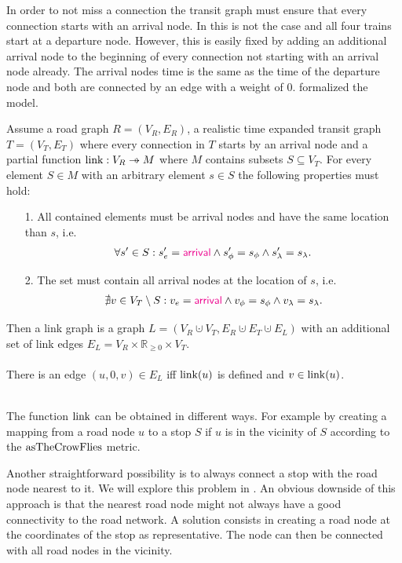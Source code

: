 	In order to not miss a connection the transit graph must ensure that every connection starts with an arrival node.
	In  this is not the case and all four trains start at a departure node. However,
	this is easily fixed by adding an additional arrival node to the beginning of every connection not starting with an arrival node already.
	The arrival nodes time is the same as the time of the departure node and both are connected by an edge with a weight of $0$.
	 formalized the model.
	\begin{mydef}\label{linkGraph}
		Assume a road graph $R = (V_R, E_R)$, a realistic time expanded transit graph $T = (V_T, E_T)$ where
		every connection in $T$ starts by an arrival node and a partial function $\link : V_R \pto M$ where $M$
		contains subsets $S \subseteq V_T$. For every element $S \in M$ with an arbitrary element $s \in S$ the following
		properties must hold:
		\begin{itemize}
			\item[1.]
				All contained elements must be arrival nodes and have the same location than $s$, i.e.
				\begin{align*}
					\forall s' \in S : s'_e = \textcolor{magenta}{\textsf{arrival}} \land s'_\phi = s_\phi \land s'_\lambda = s_\lambda.
				\end{align*}
			\item[2.]
				The set must contain all arrival nodes at the location of $s$, i.e.
				\begin{align*}
					\nexists v \in V_T \setminus S : v_e = \textcolor{magenta}{\textsf{arrival}} \land v_\phi = s_\phi \land v_\lambda = s_\lambda.
				\end{align*}
		\end{itemize}
		Then a \textnormal{link graph} is a graph $L = (V_R \cupdot V_T, E_R \cupdot E_T \cupdot E_L)$ with
		an additional set of link edges $E_L = V_R \times \mathbb{R}_{\ge 0} \times V_T$.\\\\
		There is an edge $(u, 0, v) \in E_L$ iff $\operatorname{link}(u)$ is defined and $v \in \operatorname{link}(u)$.
	\end{mydef}\quad\\
	The function $\operatorname{link}$ can be obtained in different ways. For example by creating a mapping from a road node $u$ to
	a stop $S$ if $u$ is in the vicinity of $S$ according to the $\operatorname{asTheCrowFlies}$ metric.
	
	Another straightforward possibility is to always connect a stop with the road node nearest to it. We will explore
	this problem in . An obvious downside of this approach is that the nearest road node
	might not always have a good connectivity to the road network. A solution consists in creating a road node at the coordinates
	of the stop as representative. The node can then be connected with all road nodes in the vicinity.

